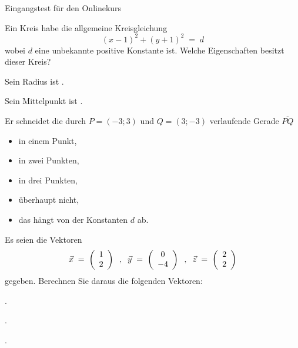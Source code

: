 \begin{MTest}{Eingangstest für den Onlinekurs}
\begin{MExercise}
Ein Kreis habe die allgemeine Kreisgleichung
$$
(x-1)^2+(y+1)^2 \;=\; d
$$
wobei $d$ eine unbekannte positive Konstante ist.
Welche Eigenschaften besitzt dieser Kreis?
\begin{MExerciseItems}
\item{Sein Radius ist .}
\item{Sein Mittelpunkt ist .}
\item{Er schneidet die durch $P=(-3;3)$ und $Q=(3;-3)$ verlaufende Gerade $\overline{P Q}$\\
\begin{itemize}
\item{ in einem Punkt,}
\item{ in zwei Punkten,}
\item{ in drei Punkten,}
\item{ überhaupt nicht,}
\item{ das hängt von der Konstanten $d$ ab.}
\end{itemize}
}
\end{MExerciseItems}
\end{MExercise}


\begin{MExercise}
Es seien die Vektoren
$$
\vec{x} \;=\; \left({\begin{array}{c}1\\2\end{array}}\right)\;\; , \;\;
\vec{y} \;=\; \left({\begin{array}{c}0\\-4\end{array}}\right)\;\; , \;\;
\vec{z} \;=\; \left({\begin{array}{c}2\\2\end{array}}\right)
$$
gegeben. Berechnen Sie daraus die folgenden Vektoren:
\begin{MExerciseItems}
\item{.}
\item{.}
\item{.}
\end{MExerciseItems}
\end{MExercise}


\end{MTest}

\newpage
\MPrintIndex


